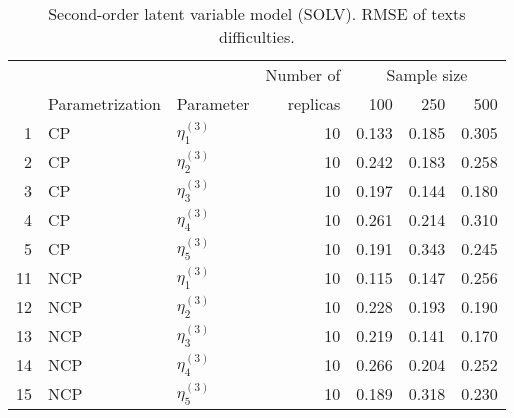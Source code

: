 \begin{table}[H]
	\centering
	\begin{tabular}{rllrrrr}
		\hline
		\multicolumn{3}{c}{ } & Number of &\multicolumn{3}{c}{ Sample size } \\ 
		\cmidrule(rl){5-7}
		& Parametrization & Parameter & replicas & 100 & 250 & 500 \\  
		\hline\hline
		1 & CP & $\eta^{(3)}_{1}$ &   10 & 0.133 & 0.185 & 0.305 \\ 
		2 & CP & $\eta^{(3)}_{2}$ &   10 & 0.242 & 0.183 & 0.258 \\ 
		3 & CP & $\eta^{(3)}_{3}$ &   10 & 0.197 & 0.144 & 0.180 \\ 
		4 & CP & $\eta^{(3)}_{4}$ &   10 & 0.261 & 0.214 & 0.310 \\ 
		5 & CP & $\eta^{(3)}_{5}$ &   10 & 0.191 & 0.343 & 0.245 \\ 
		\hline
		11 & NCP & $\eta^{(3)}_{1}$ &  10 & 0.115 & 0.147 & 0.256 \\ 
		12 & NCP & $\eta^{(3)}_{2}$ &   10 & 0.228 & 0.193 & 0.190 \\ 
		13 & NCP & $\eta^{(3)}_{3}$ &   10 & 0.219 & 0.141 & 0.170 \\ 
		14 & NCP & $\eta^{(3)}_{4}$ &   10 & 0.266 & 0.204 & 0.252 \\ 
		15 & NCP & $\eta^{(3)}_{5}$ &   10 & 0.189 & 0.318 & 0.230 \\ 
		\hline
	\end{tabular}
	\caption[Second-order latent variable model (SOLV). RMSE of texts difficulties.]%
	{Second-order latent variable model (SOLV). RMSE of texts difficulties.}
	\label{tab:SOLV_RMSE_texts_diff}
\end{table}
%
